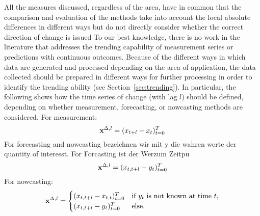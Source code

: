 All the measures discussed, regardless of the area, have in common that the comparison and evaluation of the methods take into account the local absolute differences in different ways but do not directly consider whether the correct direction of change is issued
To our best knowledge, there is no work in the literature that addresses the trending capability of measurement series or predictions with continuous outcomes.
Because of the different ways in which data are generated and processed depending on the area of application, the data collected should be prepared in different ways for further processing in order to identify the trending ability (see Section~\ref{sec:trending}). 
In particular, the following shows how the time series of change (with lag $l$) should be defined, depending on whether measurement, forecasting, or nowcasting methods are considered. For measurement:
\begin{equation}
    \mathbf{x}^{\Delta,l} = (x_{t+l} -x_{t})^T_{t=0} \label{eq:diffxl_measure}
\end{equation}
For forecasting and nowcasting bezeichnen wir mit y die wahren werte der quantity of interesst. For Forcasting ist der Werzum Zeitpu
\begin{equation}
    \mathbf{x}^{\Delta,l} = (x_{t,t+l} -y_{t})^T_{t=0} \label{eq:diffxl_forecasting}
\end{equation}
For nowcasting:
\begin{equation}
\mathbf{x}^{\Delta,l} = 
\begin{cases} 
(x_{t,t+l} -x_{t,t})^T_{t=0} & \text{if } y_{t} \text{ is not known at time } t, \\
(x_{t,t+l} -y_{t})^T_{t=0}  & \text{else}.
\end{cases} \label{eq:diffxl_nowcasting}
\end{equation}






